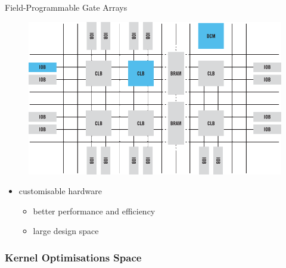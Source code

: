 \begin{frame}{Field-Programmable Gate Arrays}
 \begin{figure}[!ht]
   \includegraphics[scale=0.3]{figs/fpga-block-structure.png}
  \end{figure}
  \begin{itemize}
    \item customisable hardware
      \begin{itemize}
        \item better performance and efficiency
        \item large design space
      \end{itemize}
  \end{itemize}
\end{frame}

\begin{frame}[fragile]
  \frametitle{Kernel Optimisations Space}
  \begin{figure}[!ht]
    \centering
    \def\svgwidth{\linewidth}
    
  \end{figure}
\end{frame}

